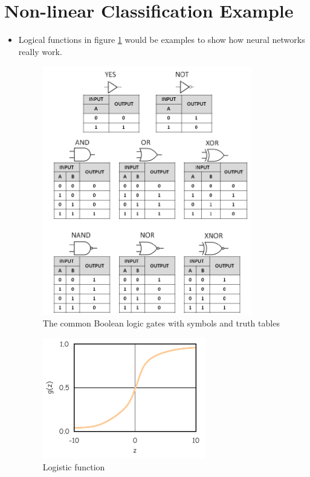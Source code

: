 \section{Non-linear Classification Example}
\begin{itemize}
    \item Logical functions in figure \ref{fig:logicGates} would be examples to show how neural networks really work.
    \begin{figure}[H]\label{fig:logicGates}
        \centering
        \includegraphics[width=3.6in]{./images/logicGates.png}
        \caption{The common Boolean logic gates with symbols and truth tables}
    \end{figure}
    
    \begin{figure}[H]\label{fig:RemindSigmoid}
        \centering
        \includegraphics[width=2.8in]{./images/sigmoid.png}
        \caption{Logistic function}
    \end{figure}
    

\end{itemize}
